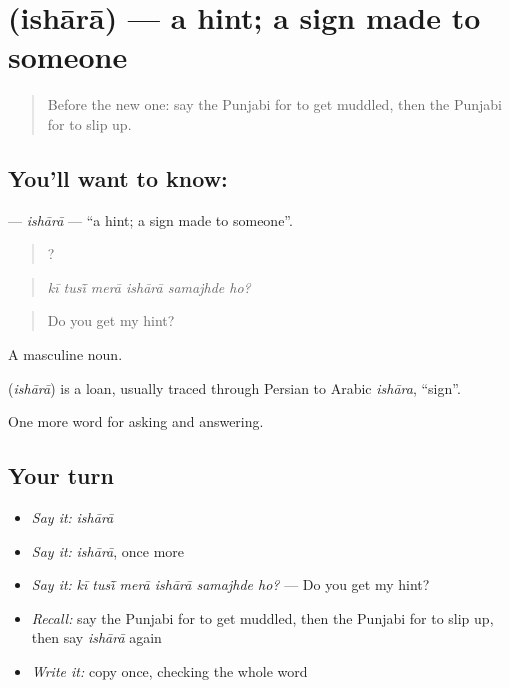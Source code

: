 \section[\texorpdfstring{\pa{ਇਸ਼ਾਰਾ} (ishārā)}{ਇਸ਼ਾਰਾ (ishārā)}]{ (ishārā) — a hint; a sign made to someone}

\label{lesson:PA-C343-ishara}



\begin{quote}
Before the new one: say the Punjabi for to get muddled, then the Punjabi for to slip up.
\end{quote}

\subsection*{You'll want to know: }
\textbf{} — \emph{ishārā} — \textquotedblleft{}a hint; a sign made to someone\textquotedblright{}.

\begin{quote}
     ?
\end{quote}

\begin{quote}
\emph{kī tusī̃ merā ishārā samajhde ho?}
\end{quote}

\begin{quote}
Do you get my hint?
\end{quote}

A masculine noun.

\begin{cousinweb}
\textbf{} (\emph{ishārā}) is a loan, usually traced through Persian to Arabic \emph{ishāra}, \textquotedblleft{}sign\textquotedblright{}.
\end{cousinweb}

\begin{grammarlens}[title={What you've built}]
One more word for asking and answering.
\end{grammarlens}

\subsection*{Your turn}
\begin{itemize}
\raggedright
  \item \emph{Say it:} \emph{ishārā}
  \item \emph{Say it:} \emph{ishārā}, once more
  \item \emph{Say it:} \emph{kī tusī̃ merā ishārā samajhde ho?} — Do you get my hint?
  \item \emph{Recall:} say the Punjabi for to get muddled, then the Punjabi for to slip up, then say \emph{ishārā} again
  \item \emph{Write it:} copy \textbf{} once, checking the whole word
\end{itemize}

